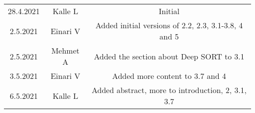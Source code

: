 \begin{center}
	\begin{tabular}{ c c c }
		28.4.2021 & Kalle L & Initial \\ 
		2.5.2021 & Einari V & Added initial versions of 2.2, 2.3, 3.1-3.8, 4 and 5 \\
		2.5.2021 & Mehmet A & Added the section about Deep SORT to 3.1 \\
		3.5.2021 & Einari V & Added more content to 3.7 and 4\\
		6.5.2021 & Kalle L & Added abstract, more to introduction, 2, 3.1, 3.7\\
	\end{tabular}
\end{center}